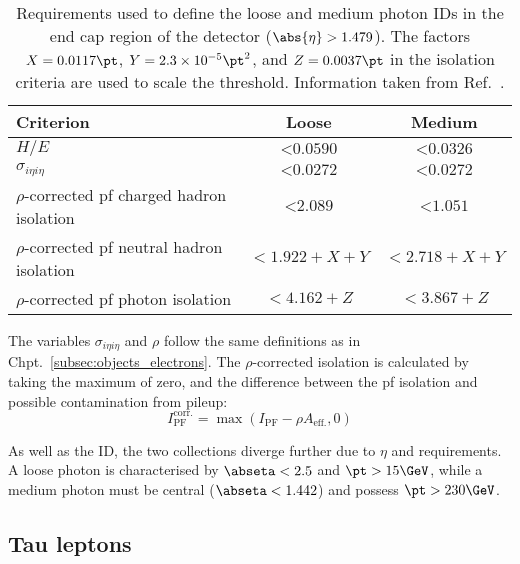 \begin{table}[htbp]
    \centering
    \begin{tabular}{lcc}
        \hline
        Criterion & Loose & Medium \\\hline
        $H/E$ & $< \text{0.0590}$ & $< \text{0.0326}$ \\
        $\sigma_{i\eta i\eta}$ & $< \text{0.0272}$ & $< \text{0.0272}$ \\
        $\rho$-corrected \acrshort{pf} charged hadron isolation & $< \text{2.089}$ & $< \text{1.051}$ \\
        $\rho$-corrected \acrshort{pf} neutral hadron isolation & $< \text{1.922} + X + Y$ & $< \text{2.718} + X + Y$ \\
        $\rho$-corrected \acrshort{pf} photon isolation & $< \text{4.162} + Z$ & $< \text{3.867} + Z$ \\\hline
    \end{tabular}
    \caption[Requirements used to define the loose and medium photon IDs in the end cap region of the detector ($\abs{\eta} > \text{1.479}$)]{Requirements used to define the loose and medium photon IDs in the end cap region of the detector ($\abs{\eta} > \text{1.479}$). The factors $X = \text{0.0117}\pt$, $Y = \text{2.3} \times \text{10}^{-5}\pt^2$, and $Z = \text{0.0037}\pt$ in the isolation criteria are used to scale the threshold. Information taken from Ref.~.}
    \label{tab:htoinv_photon_ID_endcap}
\end{table}

The variables $\sigma_{i\eta i\eta}$ and $\rho$ follow the same definitions as in Chpt.~\ref{subsec:objects_electrons}. The $\rho$-corrected isolation is calculated by taking the maximum of zero, and the difference between the \acrlong{pf} isolation and possible contamination from pileup:
\begin{equation}
I_{\mathrm{PF}}^{\mathrm{corr.}} = \max (I_{\mathrm{PF}} - \rho A_{\mathrm{eff.}}, \text{0})
\end{equation}

As well as the ID, the two collections diverge further due to $\eta$ and \pt requirements. A loose photon is characterised by $\abseta < \text{2.5}$ and $\pt > \text{15}\GeV$, while a medium photon must be central ($\abseta < \text{1.442}$) and possess $\pt > \text{230}\GeV$.




\subsection{Tau leptons}
\label{subsec:objects_taus}

